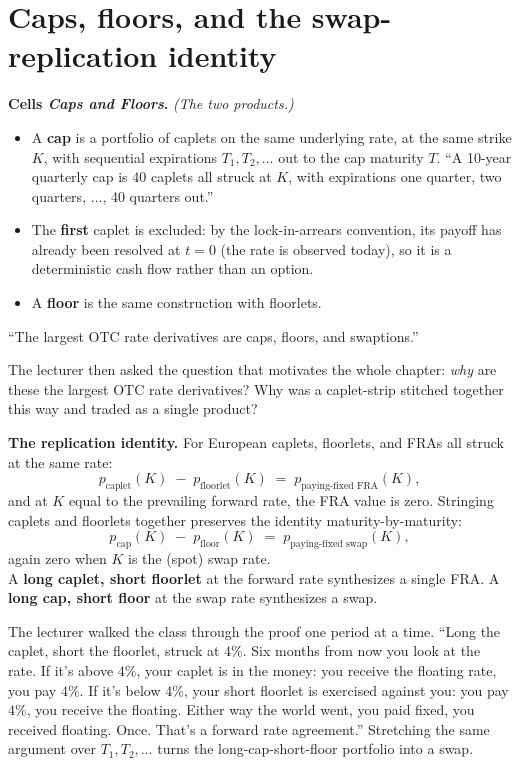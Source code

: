 \section{Caps, floors, and the swap-replication identity}\label{L6-sec:capsfloors}

\begin{keyblock}
\textbf{Cells \emph{Caps and Floors}.} \emph{(The two products.)}
\begin{itemize}
  \item A \textbf{cap} is a portfolio of caplets on the same
        underlying rate, at the same strike $K$, with sequential
        expirations $T_1, T_2, \ldots$ out to the cap maturity $T$.
        ``A 10-year quarterly cap is 40 caplets all struck at $K$,
        with expirations one quarter, two quarters, $\ldots$, 40
        quarters out.''
  \item The \textbf{first} caplet is excluded: by the lock-in-arrears
        convention, its payoff has already been resolved at $t = 0$
        (the rate is observed today), so it is a deterministic cash
        flow rather than an option.
  \item A \textbf{floor} is the same construction with floorlets.
\end{itemize}
``The largest OTC rate derivatives are caps, floors, and swaptions.''
\end{keyblock}

The lecturer then asked the question that motivates the whole chapter:
\emph{why} are these the largest OTC rate derivatives? Why was a
caplet-strip stitched together this way and traded as a single
product?

\begin{keyblock}
\textbf{The replication identity.}
For European caplets, floorlets, and FRAs all struck at the same rate:
\[
  p_{\text{caplet}}(K) \;-\; p_{\text{floorlet}}(K)
     \;=\; p_{\text{paying-fixed FRA}}(K),
\]
and at $K$ equal to the prevailing forward rate, the FRA value is
zero. Stringing caplets and floorlets together preserves the identity
maturity-by-maturity:
\[
  p_{\text{cap}}(K) \;-\; p_{\text{floor}}(K)
     \;=\; p_{\text{paying-fixed swap}}(K),
\]
again zero when $K$ is the (spot) swap rate. \\
A \textbf{long caplet, short floorlet} at the forward rate
synthesizes a single FRA. A \textbf{long cap, short floor} at the
swap rate synthesizes a swap.
\end{keyblock}

The lecturer walked the class through the proof one period at a time.
``Long the caplet, short the floorlet, struck at $4\%$. Six months
from now you look at the rate. If it's above $4\%$, your caplet is in
the money: you receive the floating rate, you pay $4\%$. If it's
below $4\%$, your short floorlet is exercised against you: you pay
$4\%$, you receive the floating. Either way the world went, you paid
fixed, you received floating. Once. That's a forward rate
agreement.'' Stretching the same argument over $T_1, T_2, \ldots$
turns the long-cap-short-floor portfolio into a swap.

